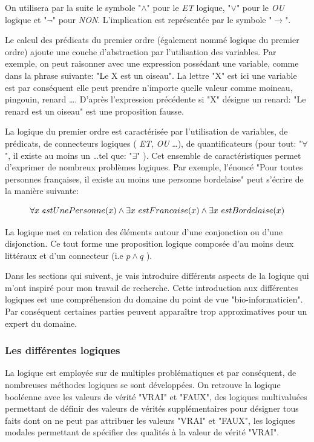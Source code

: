 \begin{refsegment}
    On utilisera par la suite le symbole "$\land$" pour le \textit{ET} logique, "$\lor$" pour le \textit{OU} logique et "$\lnot$" pour \textit{NON}. L'implication est représentée par le symbole "$\rightarrow$". 
    
    Le calcul des prédicats du premier ordre (également nommé logique du premier ordre) ajoute une couche d'abstraction par l'utilisation des variables. Par exemple, on peut raisonner avec une expression possédant une variable, comme dans la phrase suivante: "Le X est un oiseau". La lettre "X" est ici une variable est par conséquent elle peut prendre n'importe quelle valeur comme moineau, pingouin, renard \ldots. D'après l'expression précédente si "X" désigne un renard: "Le renard est un oiseau" est une proposition fausse.
    
    La logique du premier ordre est caractérisée par l'utilisation de variables, de prédicats, de connecteurs logiques ( \textit{ET}, \textit{OU} \ldots), de quantificateurs (pour tout: "$\forall$", il existe au moins un \ldots tel que: "$\exists$" ). Cet ensemble de caractéristiques permet d'exprimer de nombreux problèmes logiques. Par exemple, l'énoncé "Pour toutes personnes françaises, il existe au moins une personne bordelaise" peut s'écrire de la manière suivante:\nolisttopbreak
    
    \begin{equation*}
        \forall x~estUnePersonne(x) \land \exists x~estFrancaise(x) \land \exists x~estBordelaise(x) \stepcounter{equation}
    \end{equation*}
    
    
    La logique met en relation des éléments autour d'une conjonction ou d'une disjonction. Ce tout forme une proposition logique composée d'au moins deux littéraux et d'un connecteur (i.e $p \land q$ ).
    
    Dans les sections qui suivent, je vais introduire différents aspects de la logique qui m'ont inspiré pour mon travail de recherche. Cette introduction aux différentes logiques est une compréhension du domaine du point de vue "bio-informaticien". Par conséquent certaines parties peuvent apparaître trop approximatives pour un expert du domaine.
    
    \subsubsection{Les différentes logiques}
    
    La logique est employée sur de multiples problématiques et par conséquent, de nombreuses méthodes logiques se sont développées. On retrouve la logique booléenne avec les valeurs de vérité "VRAI" et "FAUX", des logiques multivaluées permettant de définir des valeurs de vérités supplémentaires pour désigner tous faits dont on ne peut pas attribuer les valeurs  "VRAI" et "FAUX", les logiques modales permettant de spécifier des qualités à la valeur de vérité  "VRAI".
    

\end{refsegment}
